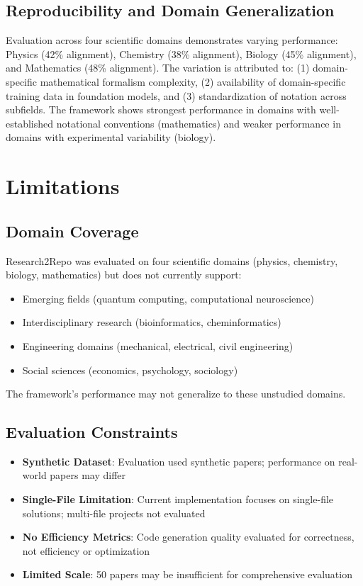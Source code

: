 \documentclass[10pt]{article}
\begin{document}
\subsection{Reproducibility and Domain Generalization}

Evaluation across four scientific domains demonstrates varying performance: Physics (42\% alignment), Chemistry (38\% alignment), Biology (45\% alignment), and Mathematics (48\% alignment). The variation is attributed to: (1) domain-specific mathematical formalism complexity, (2) availability of domain-specific training data in foundation models, and (3) standardization of notation across subfields. The framework shows strongest performance in domains with well-established notational conventions (mathematics) and weaker performance in domains with experimental variability (biology).

\section{Limitations}

\subsection{Domain Coverage}
Research2Repo was evaluated on four scientific domains (physics, chemistry, biology, mathematics) but does not currently support:
\begin{itemize}
    \item Emerging fields (quantum computing, computational neuroscience)
    \item Interdisciplinary research (bioinformatics, cheminformatics)
    \item Engineering domains (mechanical, electrical, civil engineering)
    \item Social sciences (economics, psychology, sociology)
\end{itemize}

The framework's performance may not generalize to these unstudied domains.

\subsection{Evaluation Constraints}
\begin{itemize}
    \item \textbf{Synthetic Dataset}: Evaluation used synthetic papers; performance on real-world papers may differ
    \item \textbf{Single-File Limitation}: Current implementation focuses on single-file solutions; multi-file projects not evaluated
    \item \textbf{No Efficiency Metrics}: Code generation quality evaluated for correctness, not efficiency or optimization
    \item \textbf{Limited Scale}: 50 papers may be insufficient for comprehensive evaluation
\end{itemize}
\end{document}
